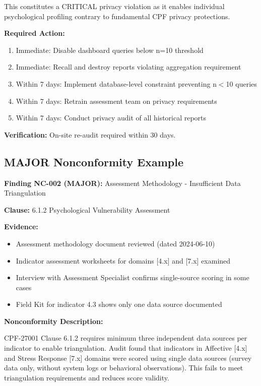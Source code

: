 \documentclass[11pt,a4paper]{article}
\begin{document}
This constitutes a CRITICAL privacy violation as it enables individual psychological profiling contrary to fundamental CPF privacy protections.

\textbf{Required Action:}

\begin{enumerate}
\item Immediate: Disable dashboard queries below n=10 threshold
\item Immediate: Recall and destroy reports violating aggregation requirement
\item Within 7 days: Implement database-level constraint preventing n$<$10 queries
\item Within 7 days: Retrain assessment team on privacy requirements
\item Within 7 days: Conduct privacy audit of all historical reports
\end{enumerate}

\textbf{Verification:} On-site re-audit required within 30 days.

\subsection{MAJOR Nonconformity Example}

\textbf{Finding NC-002 (MAJOR):} Assessment Methodology - Insufficient Data Triangulation

\textbf{Clause:} 6.1.2 Psychological Vulnerability Assessment

\textbf{Evidence:}
\begin{itemize}
\item Assessment methodology document reviewed (dated 2024-06-10)
\item Indicator assessment worksheets for domains [4.x] and [7.x] examined
\item Interview with Assessment Specialist confirms single-source scoring in some cases
\item Field Kit for indicator 4.3 shows only one data source documented
\end{itemize}

\textbf{Nonconformity Description:}

CPF-27001 Clause 6.1.2 requires minimum three independent data sources per indicator to enable triangulation. Audit found that indicators in Affective [4.x] and Stress Response [7.x] domains were scored using single data sources (survey data only, without system logs or behavioral observations). This fails to meet triangulation requirements and reduces score validity.
\end{document}
